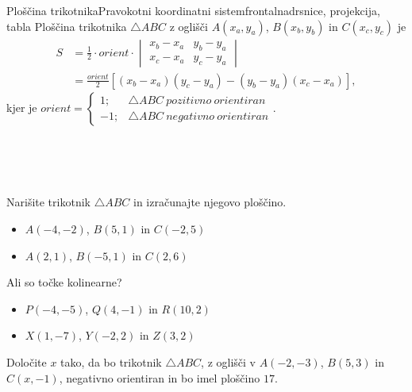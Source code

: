 \begin{priprava}{5}{}{Ploščina trikotnika}{Pravokotni koordinatni sistem}{frontalna}{drsnice, projekcija, tabla}
        Ploščina trikotnika $\triangle ABC$ z oglišči $A(x_a,y_a)$, $B(x_b,y_b)$ in $C(x_c,y_c)$ je
        $$ \begin{aligned} S &= \frac{1}{2}\cdot orient \cdot \begin{vmatrix} x_b-x_a & y_b-y_a \\ x_c-x_a & y_c-y_a \end{vmatrix} 
                \\ &= \frac{orient}{2}  \left[(x_b-x_a)(y_c-y_a)-(y_b-y_a)(x_c-x_a)\right], \end{aligned} $$
        kjer je $orient=\begin{cases} 1; & \triangle ABC ~pozitivno~orientiran \\ -1; & \triangle ABC ~negativno~orientiran \end{cases}. $







    ~\\~\\~\\

        \begin{naloga}
            Narišite trikotnik $\triangle ABC$ in izračunajte njegovo ploščino.
            \begin{itemize}
                \item $A(-4,-2)$, $B(5,1)$ in $C(-2,5)$ 
                \item $A(2,1)$, $B(-5,1)$ in $C(2,6)$ 
            \end{itemize}
        \end{naloga}

        \begin{naloga}
            Ali so točke kolinearne?
            \begin{itemize}
                \item $P(-4,-5)$, $Q(4,-1)$ in $R(10,2)$ 
                \item $X(1,-7)$, $Y(-2,2)$ in $Z(3,2)$ 
            \end{itemize}
        \end{naloga}

        \begin{naloga}
            Določite $x$ tako, da bo trikotnik $\triangle ABC$, z oglišči v $A(-2,-3)$, $B(5,3)$ in $C(x,-1)$, negativno orientiran 
            in bo imel ploščino $17$. 
        \end{naloga}
       

\end{priprava}
